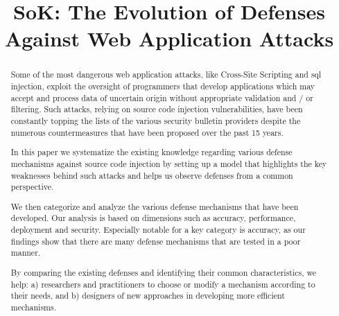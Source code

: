 \documentclass[conference]{IEEEtran}
\date{}
\begin{document}
\author{
}

\title{SoK: The Evolution of Defenses Against Web Application Attacks}

\maketitle
\begin{abstract}

  Some of the most dangerous web application attacks, like Cross-Site
  Scripting and {\sc sql} injection, exploit the oversight of
  programmers that develop applications which may accept and process
  data of uncertain origin without appropriate validation and / or
  filtering. Such attacks, relying on source code injection
  vulnerabilities, have been constantly topping the lists of the
  various security bulletin providers despite the numerous
  countermeasures that have been proposed over the past 15 years.

  In this paper we systematize the existing knowledge regarding
  various defense mechanisms against source code injection by setting
  up a model that highlights the key weaknesses behind such attacks and
  helps us observe defenses from a common perspective.

  We then categorize and analyze the various defense mechanisms that
  have been developed. Our analysis is based on dimensions such as
  accuracy, performance, deployment and security. Especially notable
  for a key category is accuracy, as our findings show that there are
  many defense mechanisms that are tested in a poor manner.

  By comparing the existing defenses and identifying their common
  characteristics, we help: a) researchers and practitioners to choose
  or modify a mechanism according to their needs, and b) designers of
  new approaches in developing more efficient mechanisms.


\end{abstract}
\end{document}
